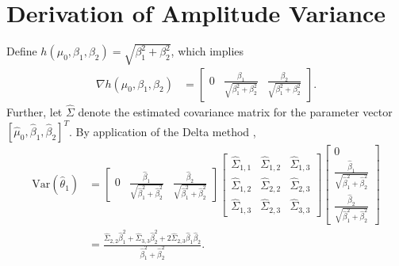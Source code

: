 \section{Derivation of Amplitude Variance} \label{app:D}
Define $h(\mu_0, \beta_1, \beta_2) = \sqrt{\beta_1^2+\beta_2^2}$, which implies
\begin{align*}
    \nabla h(\mu_0, \beta_1, \beta_2) &= \begin{bmatrix} 0 & \frac{\beta_1}{\sqrt{\beta_1^2+\beta_2^2}} & \frac{\beta_2}{\sqrt{\beta_1^2+\beta_2^2}}
    \end{bmatrix}.
\end{align*}
Further, let $\hat{\Sigma}$ denote the estimated covariance matrix for the parameter vector $[\hat{\mu}_0, \hat{\beta}_1, \hat{\beta}_2]^T$. By application of the Delta method \citep[Theorem 1.3]{Boos2013},
\begin{align*}
    \mathrm{Var}(\hat{\theta}_1) &= \begin{bmatrix} 0 & \frac{\hat{\beta}_1}{\sqrt{\hat{\beta}_1^2+\hat{\beta}_2^2}} & \frac{\hat{\beta}_2}{\sqrt{\hat{\beta}_1^2+\hat{\beta}_2^2}}
    \end{bmatrix} \begin{bmatrix}
    \hat{\Sigma}_{1,1} & \hat{\Sigma}_{1,2} & \hat{\Sigma}_{1,3} \\
    \hat{\Sigma}_{1,2} & \hat{\Sigma}_{2,2} & \hat{\Sigma}_{2,3} \\
    \hat{\Sigma}_{1,3} & \hat{\Sigma}_{2,3} & \hat{\Sigma}_{3,3}
    \end{bmatrix} \begin{bmatrix} 0 \\ \frac{\hat{\beta}_1}{\sqrt{\hat{\beta}_1^2+\hat{\beta}_2^2}} \\ \frac{\hat{\beta}_2}{\sqrt{\hat{\beta}_1^2+\hat{\beta}_2^2}}
    \end{bmatrix}  \\
    &= \frac{\hat{\Sigma}_{2,2}\hat{\beta}_1^2+\hat{\Sigma}_{3,3}\hat{\beta}_2^2 + 2\hat{\Sigma}_{2,3}\hat{\beta}_1\hat{\beta}_2}{\hat{\beta}_1^2+\hat{\beta}_2^2}.
\end{align*}

